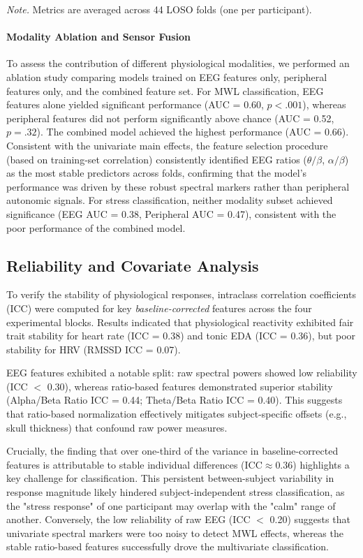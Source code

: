 \documentclass[lettersize,journal]{IEEEtran}
\begin{document}
\noindent\textit{Note.} Metrics are averaged across 44 LOSO folds (one per participant).

\paragraph{Modality Ablation and Sensor Fusion}
To assess the contribution of different physiological modalities, we performed an ablation study comparing models trained on EEG features only, peripheral features only, and the combined feature set. For MWL classification, EEG features alone yielded significant performance (AUC = 0.60, $p < .001$), whereas peripheral features did not perform significantly above chance (AUC = 0.52, $p = .32$). The combined model achieved the highest performance (AUC = 0.66). Consistent with the univariate main effects, the feature selection procedure (based on training-set correlation) consistently identified EEG ratios ($\theta/\beta$, $\alpha/\beta$) as the most stable predictors across folds, confirming that the model's performance was driven by these robust spectral markers rather than peripheral autonomic signals. For stress classification, neither modality subset achieved significance (EEG AUC = 0.38, Peripheral AUC = 0.47), consistent with the poor performance of the combined model.

\subsection{Reliability and Covariate Analysis}
To verify the stability of physiological responses, intraclass correlation coefficients (ICC) were computed for key \textit{baseline-corrected} features across the four experimental blocks. Results indicated that physiological reactivity exhibited fair trait stability for heart rate (ICC = 0.38) and tonic EDA (ICC = 0.36), but poor stability for HRV (RMSSD ICC = 0.07).

EEG features exhibited a notable split: raw spectral powers showed low reliability (ICC $<$ 0.30), whereas ratio-based features demonstrated superior stability (Alpha/Beta Ratio ICC = 0.44; Theta/Beta Ratio ICC = 0.40). This suggests that ratio-based normalization effectively mitigates subject-specific offsets (e.g., skull thickness) that confound raw power measures.

Crucially, the finding that over one-third of the variance in baseline-corrected features is attributable to stable individual differences ($\text{ICC} \approx 0.36$) highlights a key challenge for classification. This persistent between-subject variability in response magnitude likely hindered subject-independent stress classification, as the "stress response" of one participant may overlap with the "calm" range of another. Conversely, the low reliability of raw EEG (ICC $<$ 0.20) suggests that univariate spectral markers were too noisy to detect MWL effects, whereas the stable ratio-based features successfully drove the multivariate classification.
\end{document}
